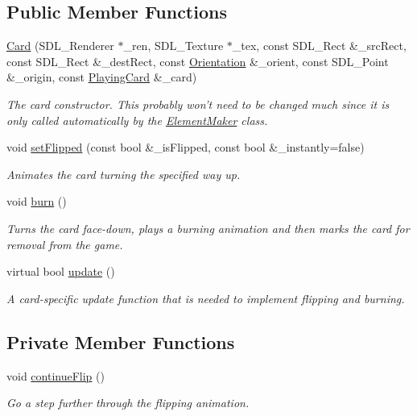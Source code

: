 \subsection*{Public Member Functions}
\begin{DoxyCompactItemize}
\item 
\hyperlink{classGUI_1_1Card_a511235d4851e0c43853fd78580b86d75}{Card} (S\-D\-L\-\_\-\-Renderer $\ast$\-\_\-ren, S\-D\-L\-\_\-\-Texture $\ast$\-\_\-tex, const S\-D\-L\-\_\-\-Rect \&\-\_\-src\-Rect, const S\-D\-L\-\_\-\-Rect \&\-\_\-dest\-Rect, const \hyperlink{namespaceGUI_a1a3a8094d47f7be06ce123fab38abf6a}{Orientation} \&\-\_\-orient, const S\-D\-L\-\_\-\-Point \&\-\_\-origin, const \hyperlink{classPlayingCard}{Playing\-Card} \&\-\_\-card)
\begin{DoxyCompactList}\small\item\em The card constructor. This probably won't need to be changed much since it is only called automatically by the \hyperlink{classGUI_1_1ElementMaker}{Element\-Maker} class. \end{DoxyCompactList}\item 
void \hyperlink{classGUI_1_1Card_a7acad65637340ffd23cf28e20560247b}{set\-Flipped} (const bool \&\-\_\-is\-Flipped, const bool \&\-\_\-instantly=false)
\begin{DoxyCompactList}\small\item\em Animates the card turning the specified way up. \end{DoxyCompactList}\item 
void \hyperlink{classGUI_1_1Card_aeef961e8d12c728ec49e68e15a1ab888}{burn} ()
\begin{DoxyCompactList}\small\item\em Turns the card face-\/down, plays a burning animation and then marks the card for removal from the game. \end{DoxyCompactList}\item 
virtual bool \hyperlink{classGUI_1_1Card_a678aebdd57e220cbada5e15996743a10}{update} ()
\begin{DoxyCompactList}\small\item\em A card-\/specific update function that is needed to implement flipping and burning. \end{DoxyCompactList}\end{DoxyCompactItemize}
\subsection*{Private Member Functions}
\begin{DoxyCompactItemize}
\item 
void \hyperlink{classGUI_1_1Card_a61be895bc983f561ecc7bd1c9ee555fb}{continue\-Flip} ()
\begin{DoxyCompactList}\small\item\em Go a step further through the flipping animation. \end{DoxyCompactList}\end{DoxyCompactItemize}

